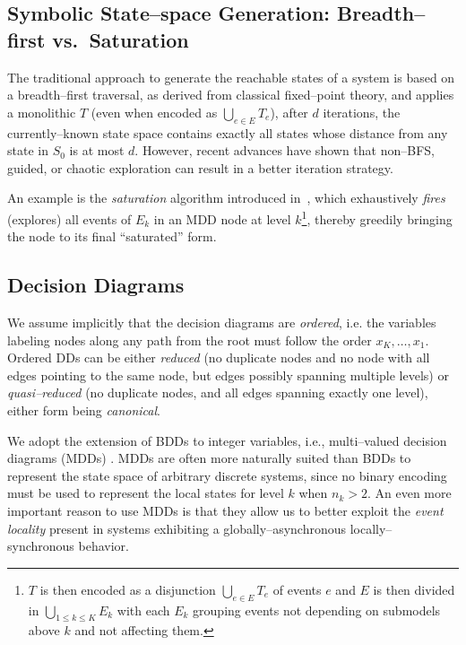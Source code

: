 \documentclass[a4paper,oneside,11pt,pdftex]{llncs}
\begin{document}
\subsection{Symbolic State--space Generation: Breadth--first vs.\ Saturation}

The traditional approach to generate the reachable states of
a system is based on a breadth--first traversal, as derived from
classical fixed--point theory, and applies a monolithic $T$
(even when encoded as $\bigcup_{e\in E}T_e$),
after $d$ iterations, the currently--known state space contains exactly
all states whose distance from any state in $S_0$ is at most $d$.
However, recent advances have shown that non--BFS, guided, or chaotic
exploration can result in a better iteration strategy.

An example is the \emph{saturation} algorithm introduced
in~\cite{Saturation2001}, which exhaustively \emph{fires}
(explores) all events of $ E_k$ in an MDD node at level $k$\footnote{$T$ is then encoded as a disjunction 
$\bigcup_{e\in E}T_e$ of events $e$ and $E$ is then divided in $\bigcup_{1 \leq k \leq K}E_k$ with each $E_k$ 
grouping events not depending on submodels above $k$ and not affecting them.},
thereby greedily bringing the node to its final ``saturated'' form.

\subsection{Decision Diagrams}

We assume implicitly that the decision diagrams are \emph{ordered},
i.e. the variables labeling nodes along any path from the root must follow
the order $x_K, \ldots, x_1$.
Ordered DDs can be either \emph{reduced} (no duplicate nodes and no node with all
edges pointing to the same node, but edges possibly spanning
multiple levels) or \emph{quasi--reduced} (no duplicate nodes, and all
edges spanning exactly one level), either form being \emph{canonical}.

We adopt the extension of BDDs to integer variables,
i.e., multi--valued decision diagrams (MDDs) \cite{Kam1998}.
MDDs are often more naturally suited than BDDs to represent the state
space of arbitrary discrete systems, since no binary encoding must be used
to represent the local states for level $k$ when $n_k > 2$.
An even more important reason to use MDDs
is that they allow us to better exploit the \emph{event locality} present
in systems exhibiting a globally--asynchronous locally--synchronous behavior.
\end{document}
